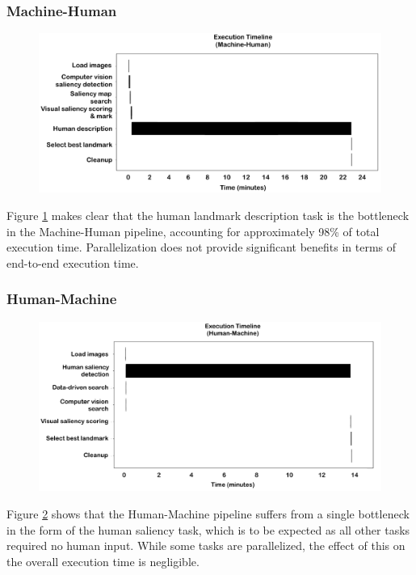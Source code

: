 \subsubsection{Machine-Human}
\begin{figure}[htbp]
  \centering
  \includegraphics[width=\textwidth]{images/timeline_mh.pdf}
  \caption{}
  \label{fig:plot:timeline:mh}
\end{figure}

Figure \ref{fig:plot:timeline:mh} makes clear that the human landmark description task is the bottleneck in the Machine-Human pipeline, accounting for approximately 98\% of total execution time. Parallelization does not provide significant benefits in terms of end-to-end execution time.

\subsubsection{Human-Machine}
\begin{figure}[htbp]
  \centering
  \includegraphics[width=\textwidth]{images/timeline_hm.pdf}
  \caption{}
  \label{fig:plot:timeline:hm}
\end{figure}

Figure \ref{fig:plot:timeline:hm} shows that the Human-Machine pipeline suffers from a single bottleneck in the form of the human saliency task, which is to be expected as all other tasks required no human input. While some tasks are parallelized, the effect of this on the overall execution time is negligible.

